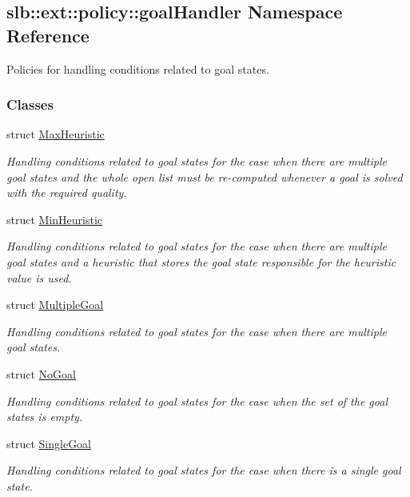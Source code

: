 \hypertarget{namespaceslb_1_1ext_1_1policy_1_1goalHandler}{}\subsection{slb\+:\+:ext\+:\+:policy\+:\+:goal\+Handler Namespace Reference}
\label{namespaceslb_1_1ext_1_1policy_1_1goalHandler}


Policies for handling conditions related to goal states.  


\subsubsection*{Classes}
\begin{DoxyCompactItemize}
\item 
struct \hyperlink{structslb_1_1ext_1_1policy_1_1goalHandler_1_1MaxHeuristic}{Max\+Heuristic}
\begin{DoxyCompactList}\small\item\em Handling conditions related to goal states for the case when there are multiple goal states and the whole open list must be re-\/computed whenever a goal is solved with the required quality. \end{DoxyCompactList}\item 
struct \hyperlink{structslb_1_1ext_1_1policy_1_1goalHandler_1_1MinHeuristic}{Min\+Heuristic}
\begin{DoxyCompactList}\small\item\em Handling conditions related to goal states for the case when there are multiple goal states and a heuristic that stores the goal state responsible for the heuristic value is used. \end{DoxyCompactList}\item 
struct \hyperlink{structslb_1_1ext_1_1policy_1_1goalHandler_1_1MultipleGoal}{Multiple\+Goal}
\begin{DoxyCompactList}\small\item\em Handling conditions related to goal states for the case when there are multiple goal states. \end{DoxyCompactList}\item 
struct \hyperlink{structslb_1_1ext_1_1policy_1_1goalHandler_1_1NoGoal}{No\+Goal}
\begin{DoxyCompactList}\small\item\em Handling conditions related to goal states for the case when the set of the goal states is empty. \end{DoxyCompactList}\item 
struct \hyperlink{structslb_1_1ext_1_1policy_1_1goalHandler_1_1SingleGoal}{Single\+Goal}
\begin{DoxyCompactList}\small\item\em Handling conditions related to goal states for the case when there is a single goal state. \end{DoxyCompactList}\end{DoxyCompactItemize}
